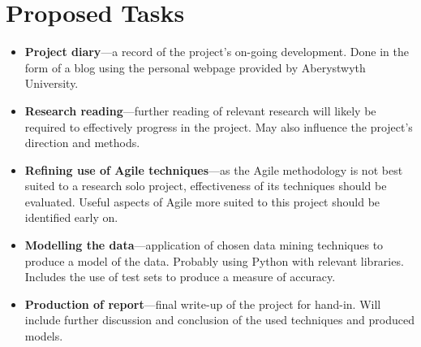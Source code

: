 \documentclass[]{article}
\begin{document}
\section{Proposed Tasks}
\begin{itemize}
	\item \textbf{Project diary}---a record of the project's on-going development.
	Done in the form of a blog using the personal webpage provided by Aberystwyth University.
	
	\item \textbf{Research reading}---further reading of relevant research will likely be required to effectively progress in the project.
	May also influence the project's direction and methods.
	
	\item \textbf{Refining use of Agile techniques}---as the Agile methodology is not best suited to a research solo project, effectiveness of its techniques should be evaluated.
	Useful aspects of Agile more suited to this project should be identified early on.
	
	\item \textbf{Modelling the data}---application of chosen data mining techniques to produce a model of the data.
	Probably using Python with relevant libraries.
	Includes the use of test sets to produce a measure of accuracy.
	
	\item \textbf{Production of report}---final write-up of the project for hand-in.
	Will include further discussion and conclusion of the used techniques and produced models.

\end{itemize}


\vspace{1cm}
\end{document}
